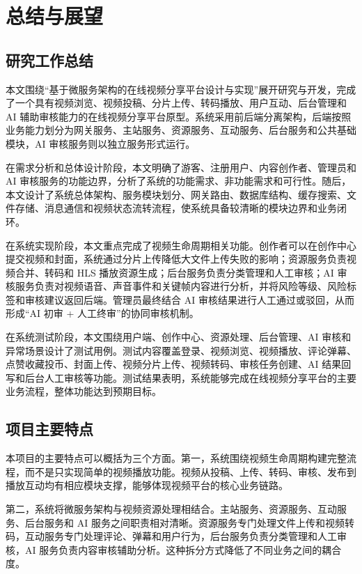 
\chapter{总结与展望}
\label{chap:conclusion-outlook}

\section{研究工作总结}
\label{sec:research-summary}

本文围绕“基于微服务架构的在线视频分享平台设计与实现”展开研究与开发，完成了一个具有视频浏览、视频投稿、分片上传、转码播放、用户互动、后台管理和 AI 辅助审核能力的在线视频分享平台原型。系统采用前后端分离架构，后端按照业务能力划分为网关服务、主站服务、资源服务、互动服务、后台服务和公共基础模块，AI 审核服务则以独立服务形式运行。

在需求分析和总体设计阶段，本文明确了游客、注册用户、内容创作者、管理员和 AI 审核服务的功能边界，分析了系统的功能需求、非功能需求和可行性。随后，本文设计了系统总体架构、服务模块划分、网关路由、数据库结构、缓存搜索、文件存储、消息通信和视频状态流转流程，使系统具备较清晰的模块边界和业务闭环。

在系统实现阶段，本文重点完成了视频生命周期相关功能。创作者可以在创作中心提交视频和封面，系统通过分片上传降低大文件上传失败的影响；资源服务负责视频合并、转码和 HLS 播放资源生成；后台服务负责分类管理和人工审核；AI 审核服务负责对视频语音、声音事件和关键帧内容进行分析，并将风险等级、风险标签和审核建议返回后端。管理员最终结合 AI 审核结果进行人工通过或驳回，从而形成“AI 初审 + 人工终审”的协同审核机制。

在系统测试阶段，本文围绕用户端、创作中心、资源处理、后台管理、AI 审核和异常场景设计了测试用例。测试内容覆盖登录、视频浏览、视频播放、评论弹幕、点赞收藏投币、封面上传、视频分片上传、视频转码、审核任务创建、AI 结果回写和后台人工审核等功能。测试结果表明，系统能够完成在线视频分享平台的主要业务流程，整体功能达到预期目标。

\section{项目主要特点}
\label{sec:project-features}

本项目的主要特点可以概括为三个方面。第一，系统围绕视频生命周期构建完整流程，而不是只实现简单的视频播放功能。视频从投稿、上传、转码、审核、发布到播放互动均有相应模块支撑，能够体现视频平台的核心业务链路。

第二，系统将微服务架构与视频资源处理相结合。主站服务、资源服务、互动服务、后台服务和 AI 服务之间职责相对清晰。资源服务专门处理文件上传和视频转码，互动服务专门处理评论、弹幕和用户行为，后台服务负责分类管理和人工审核，AI 服务负责内容审核辅助分析。这种拆分方式降低了不同业务之间的耦合度。

